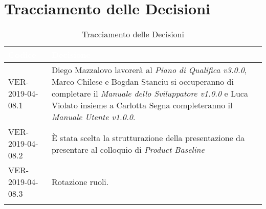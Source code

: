 \newpage
\section{Tracciamento delle Decisioni}

\begin{longtable}{|C{.40\textwidth}|C{.60\textwidth}|}
\hline
{}\textbf{\textcolor{white}{Codice}} & \textbf{\textcolor{white}{Decisione}}\\
\hline
VER-2019-04-08.1 & Diego Mazzalovo lavorerà al \textit{Piano di Qualifica v3.0.0}, Marco Chilese e Bogdan Stanciu si occuperanno di completare il \textit{Manuale dello Sviluppatore v1.0.0} e Luca Violato insieme a Carlotta Segna completeranno il \textit{Manuale Utente v1.0.0}. \\
\hline
{}VER-2019-04-08.2 & È stata scelta la strutturazione della presentazione da presentare al colloquio di \textit{Product Baseline} \\
\hline
VER-2019-04-08.3 & Rotazione ruoli. \\
\hline

\caption{Tracciamento delle Decisioni}
\end{longtable}
